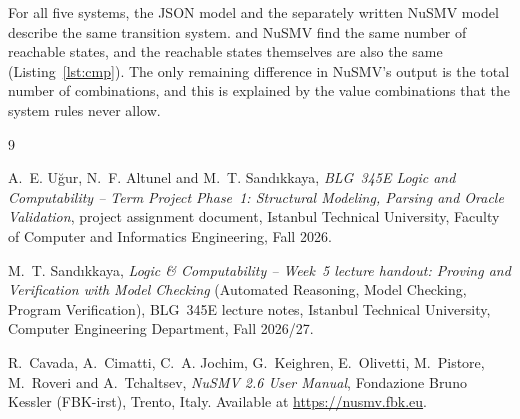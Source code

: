 \documentclass[11pt,a4paper]{article}
\DeclareRobustCommand{\code}{\codeurl}
\begin{document}
For all five systems, the JSON model and the separately written NuSMV model
describe the same transition system. \code{my_checker} and NuSMV find the same
number of reachable states, and the reachable states themselves are also the
same (Listing~\ref{lst:cmp}). The only remaining difference in NuSMV's output
is the total number of combinations, and this is explained by the value
combinations that the system rules never allow.

\clearpage
\begin{thebibliography}{9}

A.~E. Uğur, N.~F. Altunel and M.~T. Sandıkkaya,
\emph{BLG~345E Logic and Computability -- Term Project Phase~1: Structural
Modeling, Parsing and Oracle Validation},
project assignment document, Istanbul Technical University, Faculty of Computer
and Informatics Engineering, Fall 2026.


M.~T. Sandıkkaya,
\emph{Logic \& Computability -- Week~5 lecture handout: Proving and
Verification with Model Checking} (Automated Reasoning, Model Checking,
Program Verification),
BLG~345E lecture notes, Istanbul Technical University, Computer Engineering
Department, Fall 2026/27.


R.~Cavada, A.~Cimatti, C.~A. Jochim, G.~Keighren, E.~Olivetti, M.~Pistore,
M.~Roveri and A.~Tchaltsev,
\emph{NuSMV 2.6 User Manual},
Fondazione Bruno Kessler (FBK-irst), Trento, Italy.
Available at \url{https://nusmv.fbk.eu}.

\end{thebibliography}
\end{document}
